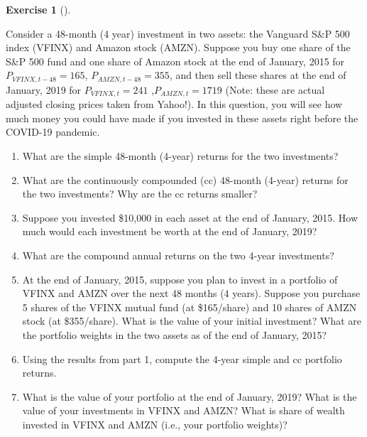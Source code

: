 \documentclass[
  letterpaper,
  DIV=11,
  numbers=noendperiod]{scrreprt}
\theoremstyle{definition}
\newtheorem{exercise}{Exercise}[chapter]
\theoremstyle{definition}
\theoremstyle{remark}
\begin{document}
\begin{exercise}[]\protect\hypertarget{exr-exercise0106}{}\label{exr-exercise0106}

Consider a 48-month (4 year) investment in two assets: the Vanguard S\&P
500 index (VFINX) and Amazon stock (AMZN). Suppose you buy one share of
the S\&P 500 fund and one share of Amazon stock at the end of January,
2015 for \(P_{VFINX,t-48}=165\), \(P_{AMZN,t-48}=355\), and then sell
these shares at the end of January, 2019 for \(P_{VFINX,t}=241\)
,\(P_{AMZN,t}=1719\) (Note: these are actual adjusted closing prices
taken from Yahoo!). In this question, you will see how much money you
could have made if you invested in these assets right before the
COVID-19 pandemic.

\begin{enumerate}
\def\labelenumi{\arabic{enumi}.}
\item
  What are the simple 48-month (4-year) returns for the two investments?
\item
  What are the continuously compounded (cc) 48-month (4-year) returns
  for the two investments? Why are the cc returns smaller?
\item
  Suppose you invested \$10,000 in each asset at the end of January,
  2015. How much would each investment be worth at the end of January,
  2019?
\item
  What are the compound annual returns on the two 4-year investments?
\item
  At the end of January, 2015, suppose you plan to invest in a portfolio
  of VFINX and AMZN over the next 48 months (4 years). Suppose you
  purchase 5 shares of the VFINX mutual fund (at \$165/share) and 10
  shares of AMZN stock (at \$355/share). What is the value of your
  initial investment? What are the portfolio weights in the two assets
  as of the end of January, 2015?
\item
  Using the results from part 1, compute the 4-year simple and cc
  portfolio returns.
\item
  What is the value of your portfolio at the end of January, 2019? What
  is the value of your investments in VFINX and AMZN? What is share of
  wealth invested in VFINX and AMZN (i.e., your portfolio weights)?
\end{enumerate}

\end{exercise}
\end{document}
